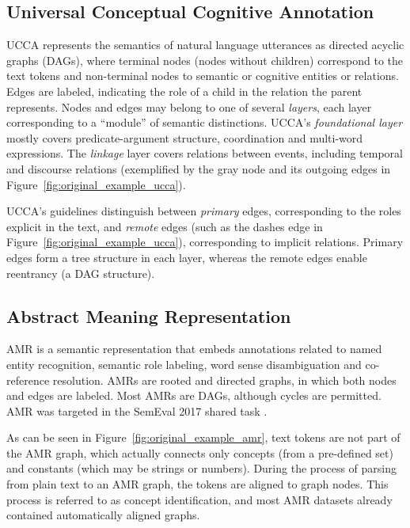 \documentclass[11pt,a4paper]{article}
\begin{document}
\subsection{Universal Conceptual Cognitive Annotation}\label{sec:ucca}

UCCA \cite{abend2013universal} represents the semantics of natural language utterances
as directed acyclic graphs (DAGs), where terminal nodes (nodes without children)
correspond to the text tokens and
non-terminal nodes to semantic or cognitive entities or relations.
Edges are labeled, indicating the role of a child in the relation the parent represents.
Nodes and edges may belong to one of several \textit{layers}, each layer corresponding
to a ``module'' of semantic distinctions.
UCCA's \textit{foundational layer} mostly covers predicate-argument
structure, coordination and multi-word expressions.
The \textit{linkage} layer covers relations between events, including temporal and discourse relations
(exemplified by the gray node and its outgoing edges in Figure~\ref{fig:original_example_ucca}).

UCCA's guidelines distinguish between \textit{primary} edges, corresponding to the roles explicit
in the text, and \textit{remote} edges (such as the dashes edge in
Figure~\ref{fig:original_example_ucca}), corresponding to implicit relations.
Primary edges form a tree structure in each layer,
whereas the remote edges enable reentrancy (a DAG structure).


\subsection{Abstract Meaning Representation}\label{sec:amr}

AMR \cite{banarescu2013abstract}
is a semantic representation that embeds annotations related
to named entity recognition, semantic role labeling, word
sense disambiguation and co-reference resolution.
AMRs are rooted and directed graphs, in which both nodes and edges are labeled.
Most AMRs are DAGs, although cycles are permitted.
AMR was targeted in the SemEval 2017 shared task \cite{may2017semeval}.

As can be seen in Figure~\ref{fig:original_example_amr}, text tokens are not part
of the AMR graph, which actually connects only concepts (from a pre-defined set)
and constants (which may be strings or numbers).
During the process of parsing from plain text to an AMR graph,
the tokens are aligned to graph nodes.
This process is referred to as concept identification, and most AMR datasets
already contained automatically aligned graphs.
\end{document}
